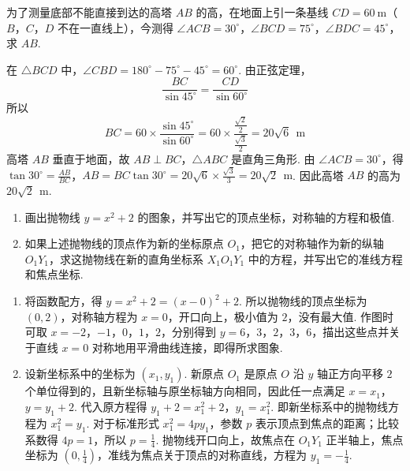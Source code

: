 \begin{problem}
为了测量底部不能直接到达的高塔 \(AB\) 的高，在地面上引一条基线 \(CD=60 \mathrm{~m}\)（\(B\)，\(C\)，\(D\) 不在一直线上），今测得 \(\angle ACB=30^\circ\)，\(\angle BCD=75^\circ\)，\(\angle BDC=45^\circ\)，求 \(AB\).

\end{problem}

\begin{solution}
在 \(\triangle BCD\) 中，\(\angle CBD=180^\circ-75^\circ-45^\circ=60^\circ\). 由正弦定理，
\[
\frac{BC}{\sin45^\circ}=\frac{CD}{\sin60^\circ}
\]
所以
\[
BC=60\times\frac{\sin45^\circ}{\sin60^\circ}=60\times\frac{\frac{\sqrt{2}}{2}}{\frac{\sqrt{3}}{2}}=20\sqrt{6}\ \mathrm{~m}
\]
高塔 \(AB\) 垂直于地面，故 \(AB\perp BC\)，\(\triangle ABC\) 是直角三角形. 由 \(\angle ACB=30^\circ\)，得
\(\tan30^\circ=\frac{AB}{BC}\)，\(AB=BC\tan30^\circ=20\sqrt{6}\times\frac{\sqrt{3}}{3}=20\sqrt{2}\ \mathrm{~m}\).
因此高塔 \(AB\) 的高为 \(20\sqrt{2}\ \mathrm{~m}\).
\end{solution}

\begin{problem}
\begin{enumerate}
\item 画出抛物线 \(y=x^2+2\) 的图象，并写出它的顶点坐标，对称轴的方程和极值.
\item 如果上述抛物线的顶点作为新的坐标原点 \(O_1\)，把它的对称轴作为新的纵轴 \(O_1Y_1\)，求这抛物线在新的直角坐标系 \(X_1O_1Y_1\) 中的方程，并写出它的准线方程和焦点坐标.
\end{enumerate}
\end{problem}

\begin{solution}
\begin{enumerate}
\item 将函数配方，得 \(y=x^2+2=(x-0)^2+2\). 所以抛物线的顶点坐标为 \((0,2)\)，对称轴方程为 \(x=0\)，开口向上，极小值为 \(2\)，没有最大值. 作图时可取 \(x=-2\)，\(-1\)，\(0\)，\(1\)，\(2\)，分别得到 \(y=6\)，\(3\)，\(2\)，\(3\)，\(6\)，描出这些点并关于直线 \(x=0\) 对称地用平滑曲线连接，即得所求图象.
\item 设新坐标系中的坐标为 \((x_1,y_1)\). 新原点 \(O_1\) 是原点 \(O\) 沿 \(y\) 轴正方向平移 \(2\) 个单位得到的，且新坐标轴与原坐标轴方向相同，因此任一点满足 \(x=x_1\)，\(y=y_1+2\). 代入原方程得
\(y_1+2=x_1^2+2\)，\(y_1=x_1^2\).
即新坐标系中的抛物线方程为 \(x_1^2=y_1\). 对于标准形式 \(x_1^2=4py_1\)，参数 \(p\) 表示顶点到焦点的距离；比较系数得 \(4p=1\)，所以 \(p=\frac{1}{4}\). 抛物线开口向上，故焦点在 \(O_1Y_1\) 正半轴上，焦点坐标为 \(\left(0,\frac{1}{4}\right)\)，准线为焦点关于顶点的对称直线，方程为 \(y_1=-\frac{1}{4}\).
\end{enumerate}
\end{solution}

